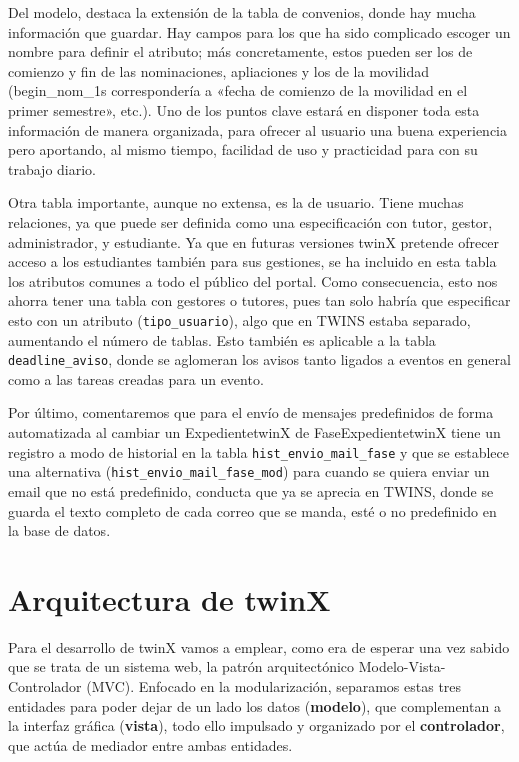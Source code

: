 Del modelo, destaca la extensión de la tabla de convenios, donde hay mucha información que guardar. Hay campos para los que ha sido complicado escoger un nombre para definir el atributo; más concretamente, estos pueden ser los de comienzo y fin de las nominaciones, apliaciones y los de la movilidad (begin\_nom\_1s correspondería a «fecha de comienzo de la movilidad en el primer semestre», etc.). Uno de los puntos clave estará en disponer toda esta información de manera organizada, para ofrecer al usuario una buena experiencia pero aportando, al mismo tiempo, facilidad de uso y practicidad para con su trabajo diario.

Otra tabla importante, aunque no extensa, es la de usuario. Tiene muchas relaciones, ya que puede ser definida como una especificación con tutor, gestor, administrador, y estudiante. Ya que en futuras versiones twinX pretende ofrecer acceso a los estudiantes también para sus gestiones, se ha incluido en esta tabla los atributos comunes a todo el público del portal. Como consecuencia, esto nos ahorra tener una tabla con gestores o tutores, pues tan solo habría que especificar esto con un atributo (\texttt{tipo\_usuario}), algo que en TWINS estaba separado, aumentando el número de tablas. Esto también es aplicable a la tabla \texttt{deadline\_aviso}, donde se aglomeran los avisos tanto ligados a eventos en general como a las tareas creadas para un evento.

Por último, comentaremos que para el envío de mensajes predefinidos de forma automatizada al cambiar un \gls{ExpedientetwinX} de \gls{FaseExpedientetwinX} tiene un registro a modo de historial en la tabla \texttt{hist\_envio\_mail\_fase} y que se establece una alternativa (\texttt{hist\_envio\_mail\_fase\_mod}) para cuando se quiera enviar un email que no está predefinido, conducta que ya se aprecia en TWINS, donde se guarda el texto completo de cada correo que se manda, esté o no predefinido en la base de datos.

\section{Arquitectura de twinX}

Para el desarrollo de twinX vamos a emplear, como era de esperar una vez sabido que se trata de un sistema web, la patrón arquitectónico Modelo-Vista-Controlador (MVC). Enfocado en la modularización, separamos estas tres entidades para poder dejar de un lado los datos (\textbf{modelo}), que complementan a la interfaz gráfica (\textbf{vista}), todo ello impulsado y organizado por el \textbf{controlador}, que actúa de mediador entre ambas entidades.

